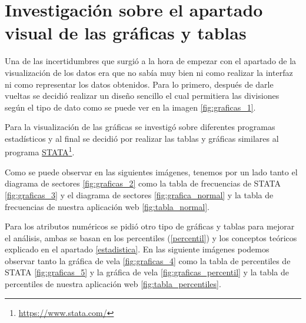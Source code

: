 \section{Investigación sobre el apartado visual de las gráficas y tablas}

Una de las incertidumbres que surgió a la hora de empezar con el apartado de la visualización de los datos era que no sabía muy bien ni como realizar la interfaz ni como representar los datos obtenidos. Para lo primero, después de darle vueltas se decidió realizar un diseño sencillo el cual permitiera las divisiones según el tipo de dato como se puede ver en la imagen \ref{fig:graficas_1}.  


Para la visualización de las gráficas se investigó sobre diferentes programas estadísticos y al final se decidió por realizar las tablas y gráficas similares al programa \href{https://www.stata.com/}{STATA}\footnote{\href{https://www.stata.com/}{https://www.stata.com/}}.

Como se puede observar en las siguientes imágenes, tenemos por un lado tanto el diagrama de sectores \ref{fig:graficas_2} como la tabla de frecuencias de STATA \ref{fig:graficas_3} y el diagrama de sectores \ref{fig:grafica_normal} y la tabla de frecuencias de nuestra aplicación web \ref{fig:tabla_normal}.


Para los atributos numéricos se pidió otro tipo de gráficas y tablas para mejorar el análisis, ambas se basan en los percentiles (\ref{percentil}) y los conceptos teóricos explicado en el apartado \ref{estadistica}. En las siguiente imágenes podemos observar tanto la gráfica de vela \ref{fig:graficas_4} como la tabla de percentiles de STATA \ref{fig:graficas_5} y la gráfica de vela \ref{fig:graficas_percentil} y la tabla de percentiles de nuestra aplicación web \ref{fig:tabla_percentiles}.


